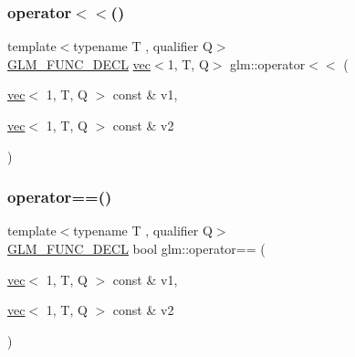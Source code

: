 \subsubsection{\texorpdfstring{operator$<$$<$()}{operator<<()}\hspace{0.1cm}{\footnotesize\ttfamily [3/3]}}
{\footnotesize\ttfamily template$<$typename T , qualifier Q$>$ \\
\hyperlink{setup_8hpp_ab2d052de21a70539923e9bcbf6e83a51}{G\+L\+M\+\_\+\+F\+U\+N\+C\+\_\+\+D\+E\+CL} \hyperlink{structglm_1_1vec}{vec}$<$1, T, Q$>$ glm\+::operator$<$$<$ (\begin{DoxyParamCaption}\item[{\hyperlink{structglm_1_1vec}{vec}$<$ 1, T, Q $>$ const \&}]{v1,  }\item[{\hyperlink{structglm_1_1vec}{vec}$<$ 1, T, Q $>$ const \&}]{v2 }\end{DoxyParamCaption})}

\mbox{\label{group__ext__vec1_gaa9cd0f18629236bade24765fd5d2616b}} 
\subsubsection{\texorpdfstring{operator==()}{operator==()}}
{\footnotesize\ttfamily template$<$typename T , qualifier Q$>$ \\
\hyperlink{setup_8hpp_ab2d052de21a70539923e9bcbf6e83a51}{G\+L\+M\+\_\+\+F\+U\+N\+C\+\_\+\+D\+E\+CL} bool glm\+::operator== (\begin{DoxyParamCaption}\item[{\hyperlink{structglm_1_1vec}{vec}$<$ 1, T, Q $>$ const \&}]{v1,  }\item[{\hyperlink{structglm_1_1vec}{vec}$<$ 1, T, Q $>$ const \&}]{v2 }\end{DoxyParamCaption})}

\mbox{\label{group__ext__vec1_ga4fbe19c5f5fba90c89934a540de87bc5}} 

